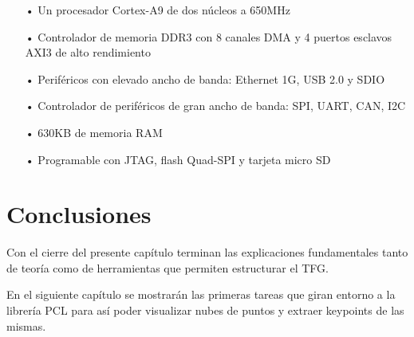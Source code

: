 \begin{itemize}
\item[•] Un procesador Cortex-A9 de dos núcleos a 650MHz
\item[•] Controlador de memoria DDR3 con 8 canales DMA y 4 puertos esclavos AXI3 de alto rendimiento
\item[•] Periféricos con elevado ancho de banda: Ethernet 1G, USB 2.0 y SDIO 
\item[•] Controlador de periféricos de gran ancho de banda: SPI, UART, CAN, I2C
\item[•] 630KB de memoria RAM
\item[•] Programable con JTAG, flash Quad-SPI y tarjeta micro SD
\end{itemize}

\section{Conclusiones}
Con el cierre del presente capítulo terminan las explicaciones fundamentales tanto de teoría como de herramientas que permiten estructurar el TFG.

En el siguiente capítulo se mostrarán las primeras tareas que giran entorno a la librería PCL para así poder visualizar nubes de puntos y extraer keypoints de las mismas.

